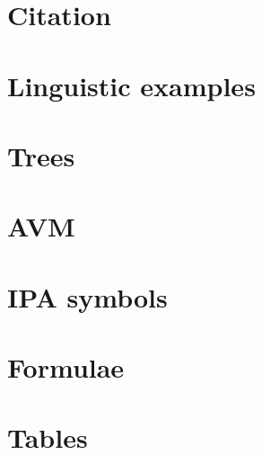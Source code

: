 \section{Citation}



\section{Linguistic examples}



\section{Trees}



\section{AVM}



\section{IPA symbols}



\section{Formulae}



\section{Tables}

